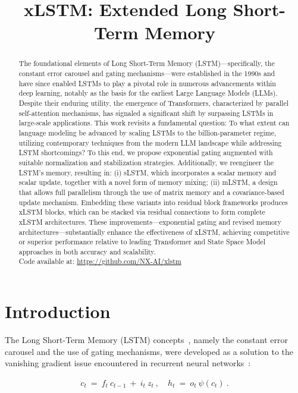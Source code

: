 \title{xLSTM: Extended Long Short-Term Memory}

\begin{abstract}
The foundational elements of Long Short-Term Memory (LSTM)—specifically, the constant error carousel and gating mechanisms—were established in the 1990s and have since enabled LSTMs to play a pivotal role in numerous advancements within deep learning, notably as the basis for the earliest Large Language Models (LLMs). Despite their enduring utility, the emergence of Transformers, characterized by parallel self-attention mechanisms, has signaled a significant shift by surpassing LSTMs in large-scale applications. This work revisits a fundamental question: To what extent can language modeling be advanced by scaling LSTMs to the billion-parameter regime, utilizing contemporary techniques from the modern LLM landscape while addressing LSTM shortcomings? To this end, we propose exponential gating augmented with suitable normalization and stabilization strategies. Additionally, we reengineer the LSTM’s memory, resulting in: (i) sLSTM, which incorporates a scalar memory and scalar update, together with a novel form of memory mixing; (ii) mLSTM, a design that allows full parallelism through the use of matrix memory and a covariance-based update mechanism. Embedding these variants into residual block frameworks produces xLSTM blocks, which can be stacked via residual connections to form complete xLSTM architectures. These improvements—exponential gating and revised memory architectures—substantially enhance the effectiveness of xLSTM, achieving competitive or superior performance relative to leading Transformer and State Space Model approaches in both accuracy and scalability.\\
Code available at: \url{https://github.com/NX-AI/xlstm}
\end{abstract}

\section{Introduction}
\label{sec:intro}

The Long Short-Term Memory (LSTM) concepts~\citep{Hochreiter:91,Hochreiter:97nips,Hochreiter:97}, namely the constant error carousel and the use of gating mechanisms, were developed as a solution to the vanishing gradient issue encountered in recurrent neural networks~\citep{Hochreiter:91,Hochreiter:00book}:

\begin{align}
\label{eq:lstm_idea}
  c_t \ = \ f_t \ c_{t-1} \ + \ 
          i_t \  z_t \ , \quad  
          h_t \ = \ o_t \ \psi({c_t}) \ . 
\end{align}

